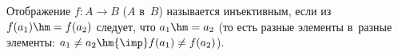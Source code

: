 
    Отображение $f\colon A\to B$ ($A$ в~$B$) называется инъективным, если из~$f(a_1)\hm=f(a_2)$ следует, что $a_1\hm=a_2$
    (то есть разные элементы в~разные элементы: $a_1\neq a_2\hm{\imp} f(a_1)\neq f(a_2)$).
